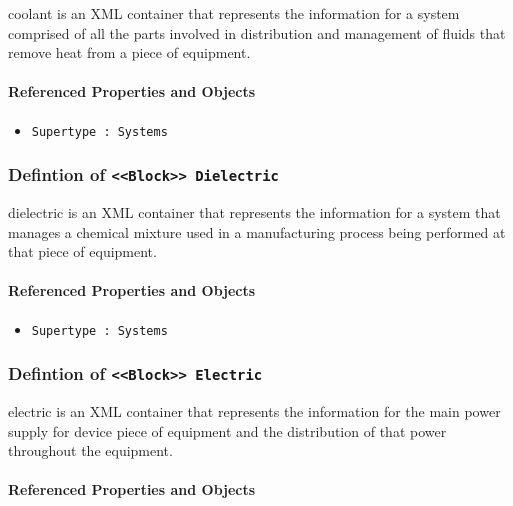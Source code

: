 \FloatBarrier

coolant is an XML container that represents the information for a system comprised of all the parts involved in distribution and management of fluids that remove heat from a piece of equipment.

\FloatBarrier
\paragraph{Referenced Properties and Objects}

\begin{itemize}
\item \texttt{Supertype : Systems}

\end{itemize}
\FloatBarrier
\subsubsection{Defintion of \texttt{<<Block>> Dielectric}}
  \label{type:Dielectric}

\FloatBarrier

dielectric is an XML container that represents the information for a system that manages a chemical mixture used in a manufacturing process being performed at that piece of equipment.

\FloatBarrier
\paragraph{Referenced Properties and Objects}

\begin{itemize}
\item \texttt{Supertype : Systems}

\end{itemize}
\FloatBarrier
\subsubsection{Defintion of \texttt{<<Block>> Electric}}
  \label{type:Electric}

\FloatBarrier

electric is an XML container that represents the information for the main power supply for device piece of equipment and the distribution of that power throughout the equipment.

\FloatBarrier
\paragraph{Referenced Properties and Objects}

